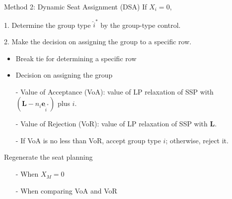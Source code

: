   
  

  
  

    


    \begin{frame}{Method 2: Dynamic Seat Assignment (DSA)}
      If $X_i = 0$,
      
      1. Determine the group type $\hat{i}^{*}$ by the group-type control.

      2. Make the decision on assigning the group to a specific row.
      \begin{itemize}
        \item Break tie for determining a specific row
        \item Decision on assigning the group
        \item[-] Value of Acceptance (VoA): value of LP relaxation of SSP with $(\mathbf{L}-n_i \mathbf{e}_{\hat{i}^{*}})$ plus $i$.
        

        \item[-] Value of Rejection (VoR): value of LP relaxation of SSP with $\mathbf{L}$.

        \item[-] If VoA is no less than VoR, accept group type $i$; otherwise, reject it.
      \end{itemize}
      Regenerate the seat planning
      \begin{itemize}
      \item[-] When $X_{M} =0$
      \item[-] When comparing VoA and VoR 
      \end{itemize}
    \end{frame}

